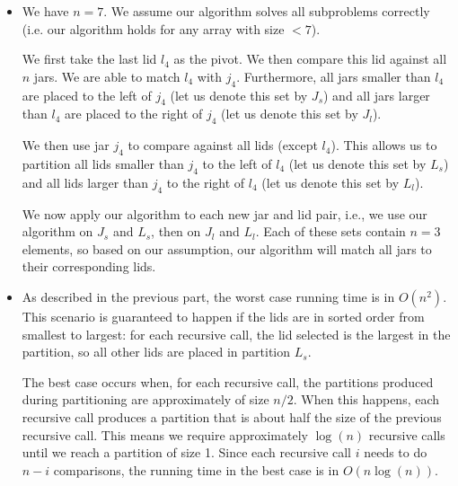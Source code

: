 \documentclass[11pt, letterpaper, titlepage]{article}
\begin{document}
\begin{itemize}
    \item We have $n = 7$. We assume our algorithm solves all subproblems correctly (i.e. our algorithm holds for any array with size $<7$). 
    
    We first take the last lid $l_4$ as the pivot. We then compare this lid against all $n$ jars. We are able to match $l_4$ with $j_4$. Furthermore, all jars smaller than $l_4$ are placed to the left of $j_4$ (let us denote this set by $J_s$) and all jars larger than $l_4$ are placed to the right of $j_4$ (let us denote this set by $J_l$). 
    
    We then use jar $j_4$ to compare against all lids (except $l_4$). This allows us to partition all lids smaller than $j_4$ to the left of $l_4$ (let us denote this set by $L_s$) and all lids larger than $j_4$ to the right of $l_4$ (let us denote this set by $L_l$). 
    
    We now apply our algorithm to each new jar and lid pair, i.e., we use our algorithm on $J_s$ and $L_s$, then on $J_l$ and $L_l$. Each of these sets contain $n = 3$ elements, so based on our assumption, our algorithm will match all jars to their corresponding lids.

    \item As described in the previous part, the worst case running time is in $O(n^2)$. This scenario is guaranteed to happen if the lids are in sorted order from smallest to largest: for each recursive call, the lid selected is the largest in the partition, so all other lids are placed in partition $L_s$.
    
    The best case occurs when, for each recursive call, the partitions produced during partitioning are approximately of size $n / 2$. When this happens, each recursive call produces a partition that is about half the size of the previous recursive call. This means we require approximately $\log(n)$ recursive calls until we reach a partition of size 1. Since each recursive call $i$ needs to do $n - i$ comparisons, the running time in the best case is in $O(n\log(n))$.
\end{itemize}
\end{document}
